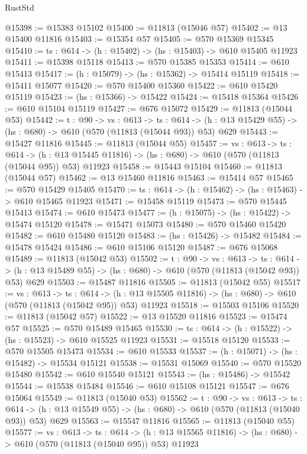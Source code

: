 \begin{lexlean}{RustStd}
\begin{coremodule}
@15398 := @15383 @15102
@15400 := @11813 (@15046 @57)
@15402 := @13 @15400 @11816
@15403 := @15354 @57
@15405 := @570 @15369 @15345
@15410 := {ts : @614} -> (h : @15402) -> (hs : @15403) -> @610 @15405 @11923
@15411 := @15398 @15118
@15413 := @570 @15385 @15353
@15414 := @610 @15413
@15417 := (h : @15079) -> (hs : @15362) -> @15414 @15119
@15418 := @15411 @15077
@15420 := @570 @15400 @15360
@15422 := @610 @15420 @15119
@15423 := (hs : @15366) -> @15422
@15424 := @15418 @15364
@15426 := @610 @15104 @15119
@15427 := @676 @15072
@15429 := @11813 (@15044 @53)
@15442 := {t : @90} ->
  {vs : @613} ->
  {ts : @614} -> (h : @13 @15429 @55) -> (hs : @680) -> @610 (@570 (@11813 (@15044 @93)) @53) @629
@15443 := @15427 @11816
@15445 := @11813 (@15044 @55)
@15457 := {vs : @613} ->
  {ts : @614} ->
  (h : @13 @15445 @11816) -> (hs : @680) -> @610 (@570 (@11813 (@15044 @95)) @53) @11923
@15458 := @15443 @15104
@15460 := @11813 (@15044 @57)
@15462 := @13 @15460 @11816
@15463 := @15414 @57
@15465 := @570 @15429 @15405
@15470 := {ts : @614} -> (h : @15462) -> (hs : @15463) -> @610 @15465 @11923
@15471 := @15458 @15119
@15473 := @570 @15445 @15413
@15474 := @610 @15473
@15477 := (h : @15075) -> (hs : @15422) -> @15474 @15120
@15478 := @15471 @15073
@15480 := @570 @15460 @15420
@15482 := @610 @15480 @15120
@15483 := (hs : @15426) -> @15482
@15484 := @15478 @15424
@15486 := @610 @15106 @15120
@15487 := @676 @15068
@15489 := @11813 (@15042 @53)
@15502 := {t : @90} ->
  {vs : @613} ->
  {ts : @614} -> (h : @13 @15489 @55) -> (hs : @680) -> @610 (@570 (@11813 (@15042 @93)) @53) @629
@15503 := @15487 @11816
@15505 := @11813 (@15042 @55)
@15517 := {vs : @613} ->
  {ts : @614} ->
  (h : @13 @15505 @11816) -> (hs : @680) -> @610 (@570 (@11813 (@15042 @95)) @53) @11923
@15518 := @15503 @15106
@15520 := @11813 (@15042 @57)
@15522 := @13 @15520 @11816
@15523 := @15474 @57
@15525 := @570 @15489 @15465
@15530 := {ts : @614} -> (h : @15522) -> (hs : @15523) -> @610 @15525 @11923
@15531 := @15518 @15120
@15533 := @570 @15505 @15473
@15534 := @610 @15533
@15537 := (h : @15071) -> (hs : @15482) -> @15534 @15121
@15538 := @15531 @15069
@15540 := @570 @15520 @15480
@15542 := @610 @15540 @15121
@15543 := (hs : @15486) -> @15542
@15544 := @15538 @15484
@15546 := @610 @15108 @15121
@15547 := @676 @15064
@15549 := @11813 (@15040 @53)
@15562 := {t : @90} ->
  {vs : @613} ->
  {ts : @614} -> (h : @13 @15549 @55) -> (hs : @680) -> @610 (@570 (@11813 (@15040 @93)) @53) @629
@15563 := @15547 @11816
@15565 := @11813 (@15040 @55)
@15577 := {vs : @613} ->
  {ts : @614} ->
  (h : @13 @15565 @11816) -> (hs : @680) -> @610 (@570 (@11813 (@15040 @95)) @53) @11923

\end{coremodule}
\end{lexlean}
